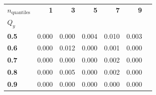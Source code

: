 \begin{tabular}{lrrrrrr}
\toprule
\textbf{$n_{\text{quantiles}}$} & \textbf{1} & \textbf{3} & \textbf{5} & \textbf{7} & \textbf{9} \\
\textbf{$Q_y$} &  &  &  &  &  \\
\midrule
\textbf{0.5} & {\cellcolor[HTML]{C6E0B4}} \num{0.000} & {\cellcolor[HTML]{C6E0B4}} \num{0.000} & {\cellcolor[HTML]{C6E0B4}} \num{0.004} & {\cellcolor[HTML]{C6E0B4}} \num{0.010} & {\cellcolor[HTML]{C6E0B4}} \num{0.003} \\
\textbf{0.6} & {\cellcolor[HTML]{C6E0B4}} \num{0.000} & {\cellcolor[HTML]{C6E0B4}} \num{0.012} & {\cellcolor[HTML]{C6E0B4}} \num{0.000} & {\cellcolor[HTML]{C6E0B4}} \num{0.001} & {\cellcolor[HTML]{C6E0B4}} \num{0.000} \\
\textbf{0.7} & {\cellcolor[HTML]{C6E0B4}} \num{0.000} & {\cellcolor[HTML]{C6E0B4}} \num{0.000} & {\cellcolor[HTML]{C6E0B4}} \num{0.000} & {\cellcolor[HTML]{C6E0B4}} \num{0.002} & {\cellcolor[HTML]{C6E0B4}} \num{0.000} \\
\textbf{0.8} & {\cellcolor[HTML]{C6E0B4}} \num{0.000} & {\cellcolor[HTML]{C6E0B4}} \num{0.005} & {\cellcolor[HTML]{C6E0B4}} \num{0.000} & {\cellcolor[HTML]{C6E0B4}} \num{0.002} & {\cellcolor[HTML]{C6E0B4}} \num{0.000} \\
\textbf{0.9} & {\cellcolor[HTML]{C6E0B4}} \num{0.000} & {\cellcolor[HTML]{C6E0B4}} \num{0.000} & {\cellcolor[HTML]{C6E0B4}} \num{0.000} & {\cellcolor[HTML]{C6E0B4}} \num{0.000} & {\cellcolor[HTML]{C6E0B4}} \num{0.000} \\
\bottomrule
\end{tabular}
